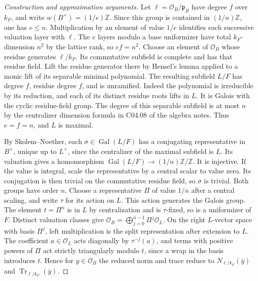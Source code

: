 \documentclass[11pt,a4paper,openany,oneside]{book}
\theoremstyle{resultstyle}
\theoremstyle{definition}
\numberwithin{equation}{chapter}
\newcommand{\ZZ}{\mathbb{Z}}
\begin{document}
\begin{proof}[Construction and approximation arguments]
Let \(\ell=\mathcal O_B/\mathfrak p_B\) have degree \(f\)
over \(k_F\), and write \(w(B^\times)=(1/e)\ZZ\).
Since this group is contained in \((1/n)\ZZ\), one has
\(e\le n\). Multiplication by an element of value \(1/e\)
identifies each successive valuation layer with \(\ell\).
The \(e\) layers modulo a base uniformizer have total
\(k_F\)-dimension \(n^2\) by the lattice rank, so \(ef=n^2\).
Choose an element of \(\mathcal O_B\) whose residue generates
\(\ell/k_F\). Its commutative subfield is complete and has
that residue field. Lift the residue generator there
by Hensel's lemma applied to a monic lift of its separable
minimal polynomial. The resulting subfield \(L/F\) has
degree \(f\), residue degree \(f\), and is unramified.
Indeed the polynomial is irreducible by its reduction,
and each of its distinct residue roots lifts in \(L\).
It is Galois with the cyclic residue-field group.
The degree of this separable subfield is at most \(n\)
by the centralizer dimension formula in C04.08 of the
algebra notes. Thus \(e=f=n\), and \(L\) is maximal.

By Skolem--Noether, each \(\sigma\in\operatorname{Gal}(L/F)\)
has a conjugating representative in \(B^\times\), unique
up to \(L^\times\), since the centralizer of the maximal
subfield is \(L\). Its valuation gives a homomorphism
\(\operatorname{Gal}(L/F)\to(1/n)\ZZ/\ZZ\). It is injective.
If the value is integral, scale the representative by a
central scalar to value zero. Its conjugation is then
trivial on the commutative residue field, so \(\sigma\)
is trivial. Both groups have order \(n\).
Choose a representative \(\Pi\) of value \(1/n\)
after a central scaling, and write \(\tau\) for its
action on \(L\). This action generates the Galois group.
The element \(t=\Pi^n\) is in \(L\) by centralization
and is \(\tau\)-fixed, so is a uniformizer of \(F\).
Distinct valuation classes give
\(\mathcal O_B=\bigoplus_{j=0}^{n-1}\Pi^j\mathcal O_L\).
On the right \(L\)-vector space with basis \(\Pi^j\),
left multiplication is the split representation after
extension to \(L\). The coefficient \(a\in \mathcal O_L\)
acts diagonally by \(\tau^{-j}(a)\), and terms with
positive powers of \(\Pi\) act strictly triangularly
modulo \(t\), since a wrap in the basis introduces \(t\).
Hence for \(y\in \mathcal O_B\) the reduced norm and trace
reduce to \(N_{\ell/k_F}(\bar y)\) and
\(\operatorname{Tr}_{\ell/k_F}(\bar y)\).


\end{proof}
\end{document}
